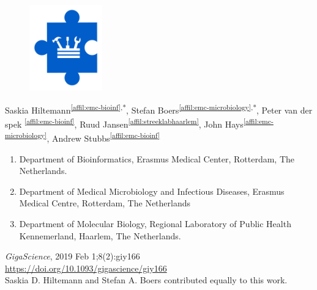 \cleartorightpage
\setcounter{NAT@ctr}{-1}
\chapter*{}\label{chapter:gmt}

\begin{figure}[t!]
\centering
\includegraphics[height=10em]{frontmatter/images/chapter-header-tools.png}
\end{figure}
\vspace{-4cm}

Saskia Hiltemann\textsuperscript{\ref{affil:emc-bioinf},*},
Stefan Boers\textsuperscript{\ref{affil:emc-microbiology},*},
Peter van der spek \textsuperscript{\ref{affil:emc-bioinf}},
Ruud Jansen\textsuperscript{\ref{affil:streeklabhaarlem}},
John Hays\textsuperscript{\ref{affil:emc-microbiology}},
Andrew Stubbs\textsuperscript{\ref{affil:emc-bioinf}}

\small
\begin{enumerate}
\itemsep-0.5em
\item Department of Bioinformatics, Erasmus Medical Center, Rotterdam, The Netherlands.\label{affil:emc-bioinf}
\item Department of Medical Microbiology and Infectious Diseases, Erasmus Medical Centre, Rotterdam, The Netherlands\label{affil:emc-microbiology}
\item Department of Molecular Biology, Regional Laboratory of Public Health Kennemerland, Haarlem, The Netherlands.\label{affil:streeklabhaarlem}
\end{enumerate}

{\color{chaptergrey}{Published in:}} \emph{GigaScience}, 2019 Feb 1;8(2):giy166 \\
{\color{chaptergrey}{DOI:}} \url{https://doi.org/10.1093/gigascience/giy166} \\
{\color{chaptergrey}{*:}} Saskia D. Hiltemann and Stefan A. Boers contributed equally to this work.



